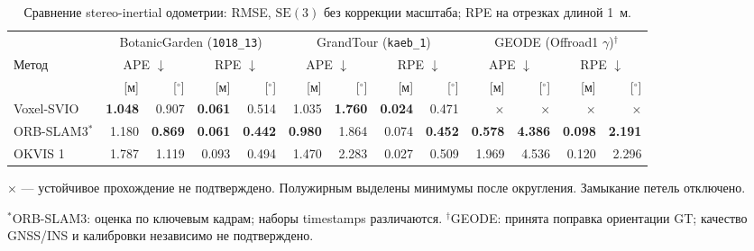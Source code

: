 \begin{table}[tbp]
\centering
\scriptsize
\setlength{\tabcolsep}{2.5pt}
\renewcommand{\arraystretch}{1.15}
\caption{Сравнение stereo-inertial одометрии: RMSE, $\mathrm{SE}(3)$ без коррекции масштаба; RPE на отрезках длиной 1~м.}
\label{tab:vio-reference-results}
\begin{tabular*}{\linewidth}{@{\extracolsep{\fill}}lrrrrrrrrrrrr@{}}
\toprule
 & \multicolumn{4}{c}{BotanicGarden (\texttt{1018\_13})} & \multicolumn{4}{c}{GrandTour (\texttt{kaeb\_1})} & \multicolumn{4}{c}{GEODE (Offroad1 $\gamma$)$^{\dagger}$} \\
\cmidrule(lr){2-5}\cmidrule(lr){6-9}\cmidrule(lr){10-13}
Метод & \multicolumn{2}{c}{APE $\downarrow$} & \multicolumn{2}{c}{RPE $\downarrow$} & \multicolumn{2}{c}{APE $\downarrow$} & \multicolumn{2}{c}{RPE $\downarrow$} & \multicolumn{2}{c}{APE $\downarrow$} & \multicolumn{2}{c}{RPE $\downarrow$} \\
\cmidrule(lr){2-3}\cmidrule(lr){4-5}\cmidrule(lr){6-7}\cmidrule(lr){8-9}\cmidrule(lr){10-11}\cmidrule(lr){12-13}
 & [м] & [$^\circ$] & [м] & [$^\circ$] & [м] & [$^\circ$] & [м] & [$^\circ$] & [м] & [$^\circ$] & [м] & [$^\circ$] \\
\midrule
Voxel-SVIO & \textbf{1.048} & 0.907 & \textbf{0.061} & 0.514 & 1.035 & \textbf{1.760} & \textbf{0.024} & 0.471 & $\times$ & $\times$ & $\times$ & $\times$ \\
\rowcolor{black!5}
ORB-SLAM3$^{*}$ & 1.180 & \textbf{0.869} & \textbf{0.061} & \textbf{0.442} & \textbf{0.980} & 1.864 & 0.074 & \textbf{0.452} & \textbf{0.578} & \textbf{4.386} & \textbf{0.098} & \textbf{2.191} \\
OKVIS 1 & 1.787 & 1.119 & 0.093 & 0.494 & 1.470 & 2.283 & 0.027 & 0.509 & 1.969 & 4.536 & 0.120 & 2.296 \\
\bottomrule
\end{tabular*}
\par\smallskip
\begin{minipage}{\linewidth}\footnotesize
$\times$ --- устойчивое прохождение не подтверждено. Полужирным выделены минимумы после округления. Замыкание петель отключено.
\par $^{*}$ORB-SLAM3: оценка по ключевым кадрам; наборы timestamps различаются. $^{\dagger}$GEODE: принята поправка ориентации GT; качество GNSS/INS и калибровки независимо не подтверждено.
\end{minipage}
\end{table}
